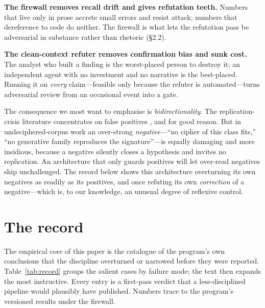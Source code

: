 \documentclass[11pt]{article}
\begin{document}
\textbf{The firewall removes recall drift and gives refutation teeth.} Numbers that live
only in prose accrete small errors and resist attack; numbers that dereference to code do
neither. The firewall is what lets the refutation pass be adversarial in substance rather
than rhetoric (\S2.2).

\textbf{The clean-context refuter removes confirmation bias and sunk cost.} The analyst who
built a finding is the worst-placed person to destroy it; an independent agent with no
investment and no narrative is the best-placed. Running it on \emph{every} claim---feasible
only because the refuter is automated---turns adversarial review from an occasional event
into a gate.

The consequence we most want to emphasise is \emph{bidirectionality}. The replication-crisis
literature concentrates on false positives \citep{ioannidis2005why,simmons2011false}, and for
good reason. But in undeciphered-corpus work an over-strong \emph{negative}---``no cipher of
this class fits,'' ``no generative family reproduces the signature''---is equally damaging
and more insidious, because a negative silently closes a hypothesis and invites no
replication. An architecture that only guards positives will let over-read negatives ship
unchallenged. The record below shows this architecture overturning its own negatives as
readily as its positives, and once refuting its own \emph{correction} of a negative---which
is, to our knowledge, an unusual degree of reflexive control.

\section{The record}
The empirical core of this paper is the catalogue of the program's own conclusions that the
discipline overturned or narrowed before they were reported. Table~\ref{tab:record} groups
the salient cases by failure mode; the text then expands the most instructive. Every entry
is a first-pass verdict that a less-disciplined pipeline would plausibly have published.
Numbers trace to the program's versioned results under the firewall.
\end{document}
